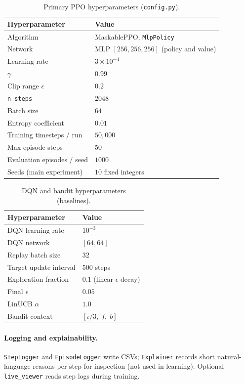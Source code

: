 \begin{table}[H]
\centering
\caption{Primary PPO hyperparameters (\texttt{config.py}).}
\label{tab:ppo_hparams}
\begin{tabular}{ll}
\toprule
\textbf{Hyperparameter} & \textbf{Value} \\
\midrule
Algorithm & MaskablePPO, \texttt{MlpPolicy} \\
Network & MLP $[256,256,256]$ (policy and value) \\
Learning rate & $3\times 10^{-4}$ \\
$\gamma$ & $0.99$ \\
Clip range $\epsilon$ & $0.2$ \\
\texttt{n\_steps} & $2048$ \\
Batch size & $64$ \\
Entropy coefficient & $0.01$ \\
Training timesteps / run & $50{,}000$ \\
Max episode steps & $50$ \\
Evaluation episodes / seed & $1000$ \\
Seeds (main experiment) & $10$ fixed integers \\
\bottomrule
\end{tabular}
\end{table}

\begin{table}[H]
\centering
\caption{DQN and bandit hyperparameters (baselines).}
\label{tab:dqn_hparams}
\begin{tabular}{ll}
\toprule
\textbf{Hyperparameter} & \textbf{Value} \\
\midrule
DQN learning rate & $10^{-3}$ \\
DQN network & $[64, 64]$ \\
Replay batch size & $32$ \\
Target update interval & $500$ steps \\
Exploration fraction & $0.1$ (linear $\epsilon$-decay) \\
Final $\epsilon$ & $0.05$ \\
LinUCB $\alpha$ & $1.0$ \\
Bandit context & $[\iota/3,\; f,\; b]$ \\
\bottomrule
\end{tabular}
\end{table}

\paragraph{Logging and explainability.}
\texttt{StepLogger} and \texttt{EpisodeLogger} write CSVs; \texttt{Explainer} records short natural-language reasons per step for inspection (not used in learning). Optional \texttt{live\_viewer} reads step logs during training.

